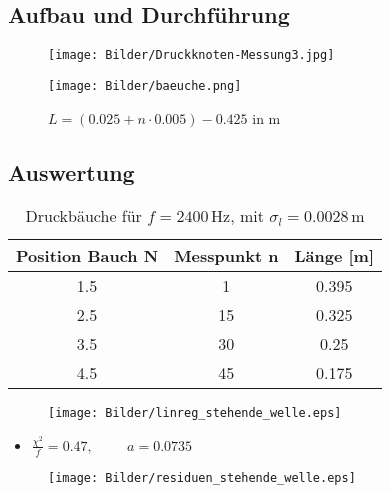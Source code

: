 \documentclass[11pt]{beamer}
\begin{document}
\subsection{Aufbau und Durchführung}
\begin{frame}
\begin{figure}[H]
\centering
\texttt{[image: Bilder/Druckknoten-Messung3.jpg]}
\end{figure}
\end{frame}

\begin{frame}
\begin{figure}[H]
\centering
\texttt{[image: Bilder/baeuche.png]}
\caption{$L = (0.025 + n\cdot 0.005) - 0.425$ in m}
\end{figure}
\end{frame}

\subsection{Auswertung}
\begin{frame}
\begin{table}[H]
\begin{tabular}{c|c|c}
Position Bauch N & Messpunkt n & Länge [m] \\ 
\hline 
1.5 & 1 & 0.395 \\ 
2.5 & 15 & 0.325 \\ 
3.5 & 30 & 0.25 \\ 
4.5 & 45 & 0.175 \\ 
\end{tabular}
\caption{Druckbäuche für $f = 2400\,$Hz, mit $\sigma_l = 0.0028\,$m}
\end{table}
\end{frame}

\begin{frame}
\begin{figure}[H]
\centering
\texttt{[image: Bilder/linreg\_stehende\_welle.eps]}
\end{figure}
\begin{itemize}
\item $\frac{\chi^2}{f} = 0.47, \hspace{1cm} a=0.0735$
\end{itemize}
\end{frame}

\begin{frame}
\begin{figure}[H]
\centering
\texttt{[image: Bilder/residuen\_stehende\_welle.eps]}
\end{figure}
\end{frame}
\end{document}
